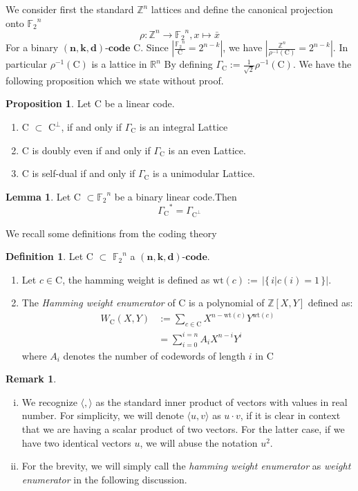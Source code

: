 \documentclass[12pt]{article}
\theoremstyle{definition}
\newtheorem{lemma}[theorem]{Lemma}
\newtheorem{definition}[theorem]{Definition}
\newtheorem{prop}[theorem]{Proposition}
\newtheorem{remark}[theorem]{Remark}
\numberwithin{equation}{theorem}
\numberwithin{figure}{theorem}
\newcommand{\Ftwo}{\ensuremath{\mathbb{F}_2}}
\newcommand{\simpleCodes}{\ensuremath{\mathrm{C}}}
\newcommand{\buildVertical}[1]{\ensuremath{#1^{\bot}}}
\newcommand{\buildLattice}[1]{\ensuremath{\Gamma_{#1}}}
\newcommand{\weightEnumerator}[3]{\ensuremath{W_{#1}(#2,#3)}}
\newcommand{\linearCode}[3]{\ensuremath{\bm{(#1,#2,#3)\mbox{-}code}}}
\newcommand{\wt}[1]{\ensuremath{\text{wt}(#1)}}
\newcommand{\Integer}{\ensuremath{\mathbb{Z}}}
\newcommand{\Real}{\ensuremath{\mathbb{R}}}
\begin{document}
We consider first the standard $\Integer^{n}$ lattices and define the canonical projection onto $\Ftwo^{n}$
\[
	\rho: \Integer^n \rightarrow \Ftwo^{n}, x \mapsto \bar{x}
\]
For a binary {\linearCode{n}{k}{d}} {\simpleCodes}. Since $|\frac{\Ftwo^n}{\simpleCodes} = 2^{n-k}|$, we have $|\frac{\Integer^{n}}{\rho^{-1}(\simpleCodes)} = 2^{n-k}|$. In particular $\rho^{-1}(\simpleCodes)$ is a lattice in $\Real^n$
By defining $\Gamma_{\simpleCodes} := \frac{1}{\sqrt{2}}\rho^{-1}(\simpleCodes)$. We have the following proposition which we state without proof.
\begin{prop}\label{codeLatticeProp} Let {\simpleCodes} be a linear code.
	\begin{enumerate}
		\item {\simpleCodes} $\subset$ {\buildVertical{\simpleCodes}}, if and only if {\buildLattice{\simpleCodes}} is an integral Lattice
		\item {\simpleCodes} is doubly even if and only if {\buildLattice{\simpleCodes}} is an even Lattice.
		\item {\simpleCodes} is self-dual if and only if {\buildLattice{\simpleCodes}} is a unimodular Lattice.
	\end{enumerate}
\end{prop}
\begin{lemma}\label{latticeDualcodeVertLemma}
Let {\simpleCodes} $\subset \Ftwo^n$ be a binary linear code.Then
\[
	\buildLattice{\simpleCodes}^* = \buildLattice{\buildVertical{\simpleCodes}}
\]
\end{lemma}
We recall some definitions from the coding theory
\begin{definition} Let {\simpleCodes} $\subset$ $\Ftwo^{n}$ a \linearCode{n}{k}{d}. 
	\begin{enumerate}
		\item Let $c \in \simpleCodes$, the hamming weight is defined as $\wt{c} := \,|\{\,i| c(i) = 1\,\}|$.
		\item The \emph{Hamming weight enumerator} of {\simpleCodes} is a polynomial of $\Integer[X,Y]$ defined as:
		\begin{align*}
			\weightEnumerator{\simpleCodes}{X}{Y} &:= \sum_{c \in \simpleCodes}X^{n - \wt{c}}Y^{\wt{c}}\\
			&= \sum_{i = 0}^{i = n}A_i X^{n - i}Y^i
		\end{align*}
		where $A_i$ denotes the number of codewords of length $i$ in {\simpleCodes}
	\end{enumerate}
\end{definition}
\begin{remark}
\begin{enumerate}[i)]
\item
We recognize $\langle , \rangle$ as the standard inner product of vectors with values in real number. For simplicity, we will denote $\langle u,v \rangle$ as $u \cdot v$, if it is clear in context that we are having a scalar product of two vectors. For the latter case, if we have two identical vectors $u$, we will abuse the notation $u^2$.
\item
For the brevity, we will simply call the \emph{hamming weight enumerator} as \emph{weight enumerator} in the following discussion.
\end{enumerate}
\end{remark}
\end{document}
